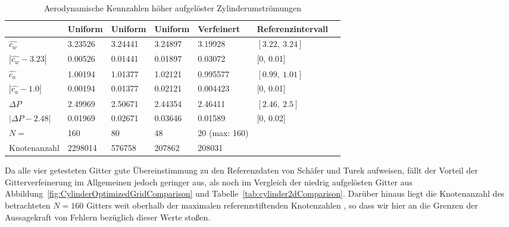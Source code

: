 \begin{table}[H]
\centering
{}

\begin{tabular}{l l l l l l l}
& Uniform & Uniform & Uniform & Verfeinert & Referenzintervall \cite{SchaeferTurek96} \\
\hline
\hline
\(\widehat{c_w}\) & \num{3.23526} & \num{3.24441} & \num{3.24897} & \num{3.19928} & \([\num[round-mode=off]{3.22},\ \num[round-mode=off]{3.24}]\) \\
\(|\widehat{c_w}-\num[round-mode=off]{3.23}|\) & \num{0.00526} & \num{0.01441} & \num{0.01897} & \num{0.03072} & [\num[round-mode=off]{0}, \num[round-mode=off]{0.01}] \\
\hline
\(\widehat{c_a}\) & \num{1.00194} & \num{1.01377} & \num{1.02121} & \num{0.995577} & \([\num[round-mode=off]{0.99},\ \num[round-mode=off]{1.01}]\) \\
\(|\widehat{c_a}-\num[round-mode=off]{1.0}|\) & \num{0.00194} & \num{0.01377} & \num{0.02121} & \num{0.004423} & [\num[round-mode=off]{0}, \num[round-mode=off]{0.01}]  \\
\hline
\(\Delta P\) & \num{2.49969} & \num{2.50671} & \num{2.44354} & \num{2.46411} & \([\num[round-mode=off]{2.46},\ \num[round-mode=off]{2.5}]\)  \\
\(|\Delta P-\num[round-mode=off]{2.48}|\) & \num{0.01969} & \num{0.02671} & \num{0.03646} & \num{0.01589} & [\num[round-mode=off]{0}, \num[round-mode=off]{0.02}] \\
\hline
\hline
\(N=\) & \num{160} & \num{80} & \num{48} & \num{20} (max: \num{160}) & \\
Knotenanzahl & \num{2298014} & \num{576758} & \num{207862} & \num{208031} & \\
\end{tabular}
\caption{Aerodynamische Kennzahlen höher aufgelöster Zylinderumströmungen}
\label{tab:cylinder2dHighResComparison}
\end{table}


Da alle vier getesteten Gitter gute Übereinstimmung zu den Referenzdaten von Schäfer und Turek aufweisen, fällt der Vorteil der Gitterverfeinerung im Allgemeinen jedoch geringer aus, als noch im Vergleich der niedrig aufgelösten Gitter aus Abbildung~\ref{fig:CylinderOptimizedGridComparison} und Tabelle~\ref{tab:cylinder2dComparison}. Darüber hinaus liegt die Knotenanzahl des betrachteten \(N=160\) Gitters weit oberhalb der maximalen referenzstiftenden Knotenzahlen \cite[Tabelle~4]{SchaeferTurek96}, so dass wir hier an die Grenzen der Aussagekraft von Fehlern bezüglich dieser Werte stoßen.

